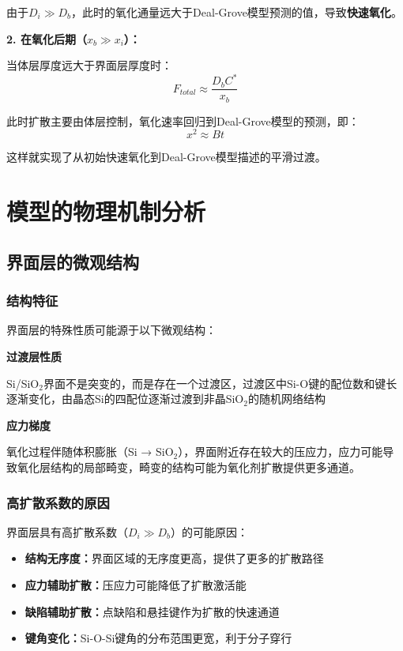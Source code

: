 \documentclass[UTF8,12pt,a4paper]{ctexart}
\begin{document}
由于$D_i \gg D_b$，此时的氧化通量远大于Deal-Grove模型预测的值，导致\textbf{快速氧化}。

\textbf{2. 在氧化后期（$x_b \gg x_i$）：}

当体层厚度远大于界面层厚度时：
\begin{equation}
F_{total} \approx \frac{D_b C^*}{x_b}
\end{equation}

此时扩散主要由体层控制，氧化速率回归到Deal-Grove模型的预测，即：
\begin{equation}
x^2 \approx B t
\end{equation}

这样就实现了从初始快速氧化到Deal-Grove模型描述的平滑过渡。

\section{模型的物理机制分析}

\subsection{界面层的微观结构}

\subsubsection{结构特征}

界面层的特殊性质可能源于以下微观结构：

\textbf{过渡层性质}
    
Si/SiO$_2$界面不是突变的，而是存在一个过渡区，过渡区中Si-O键的配位数和键长逐渐变化，由晶态Si的四配位逐渐过渡到非晶SiO$_2$的随机网络结构

\textbf{应力梯度}
    
氧化过程伴随体积膨胀（Si → SiO$_2$），界面附近存在较大的压应力，应力可能导致氧化层结构的局部畸变，畸变的结构可能为氧化剂扩散提供更多通道。
    


\subsubsection{高扩散系数的原因}

界面层具有高扩散系数（$D_i \gg D_b$）的可能原因：

\begin{itemize}
    \item \textbf{结构无序度：}界面区域的无序度更高，提供了更多的扩散路径
    \item \textbf{应力辅助扩散：}压应力可能降低了扩散激活能
    \item \textbf{缺陷辅助扩散：}点缺陷和悬挂键作为扩散的快速通道
    \item \textbf{键角变化：}Si-O-Si键角的分布范围更宽，利于分子穿行
\end{itemize}
\end{document}
